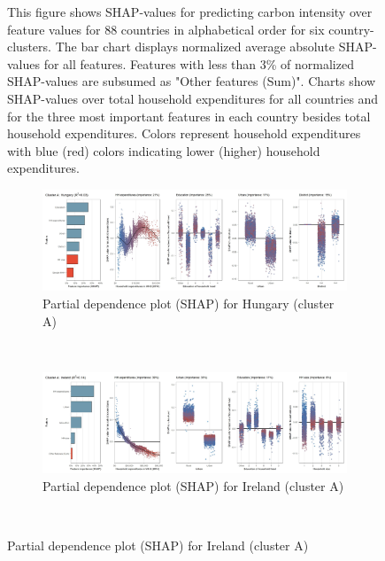 \begin{figure}[ht!]
    \begin{subcaption2}
     This figure shows SHAP-values for predicting carbon intensity over feature values for 88 countries in alphabetical order for six country-clusters. The bar chart displays normalized average absolute SHAP-values for all features. Features with less than 3\% of normalized SHAP-values are subsumed as "Other features (Sum)". Charts show SHAP-values over total household expenditures for all countries and for the three most important features in each country besides total household expenditures. Colors represent household expenditures with blue (red) colors indicating lower (higher) household expenditures.
     \end{subcaption2}
\end{figure}

\begin{figure}[ht!]\ContinuedFloat
    \centering
   \begin{subfigure}[b]{\textwidth}
     \centering
         \caption{Partial dependence plot (SHAP) for Hungary (cluster A)}
         \label{fig:5b_HUN}
         \includegraphics[width=\textwidth]{Figure 5b/Figure_5b_HUN}
    \end{subfigure}
    \\
    \vspace{0.5cm}
    \begin{subfigure}[b]{\textwidth}
      \centering
         \caption{Partial dependence plot (SHAP) for Ireland (cluster A)}
         \label{fig:5b_IRL}
         \includegraphics[width=\textwidth]{Figure 5b/Figure_5b_IRL}   
     \end{subfigure}
    \\

\end{figure}
